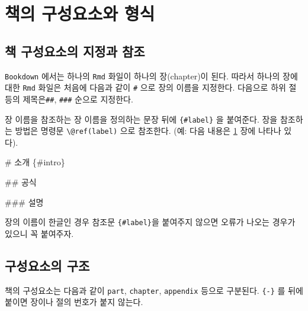 \documentclass[
]{book}
\makeatletter
\newenvironment{Shaded}{\begin{snugshade}}{\end{snugshade}}
\newcommand{\FunctionTok}[1]{\textcolor[rgb]{0.00,0.00,0.00}{#1}}
\newenvironment{kframe}{%
\medskip{}
\setlength{\fboxsep}{.8em}
 \def\at@end@of@kframe{}%
 \ifinner\ifhmode%
  \def\at@end@of@kframe{\end{minipage}}%
  \begin{minipage}{\columnwidth}%
 \fi\fi%
 \def\FrameCommand##1{\hskip\@totalleftmargin \hskip-\fboxsep
 \colorbox{shadecolor}{##1}\hskip-\fboxsep
     \hskip-\linewidth \hskip-\@totalleftmargin \hskip\columnwidth}%
 \MakeFramed {\advance\hsize-\width
   \@totalleftmargin\z@ \linewidth\hsize
   \@setminipage}}%
 {\par\unskip\endMakeFramed%
 \at@end@of@kframe}
\newenvironment{rmdblock}[1]
  {
  \begin{itemize}
  \renewcommand{\labelitemi}{
    \raisebox{-.7\height}[0pt][0pt]{
      {\setkeys{Gin}{width=3em,keepaspectratio}\texttt{[image: images/\#1]}}
    }
  }
  \setlength{\fboxsep}{1em}
  \begin{kframe}
  \item
  }
  {
  \end{kframe}
  \end{itemize}
  }
\newenvironment{rmdcaution}
  {\begin{rmdblock}{caution}}
  {\end{rmdblock}}
\theoremstyle{definition}
\theoremstyle{definition}
\theoremstyle{definition}
\theoremstyle{definition}
\theoremstyle{remark}
\makeatother
\begin{document}
\mainmatter

\hypertarget{intro}{%
\chapter{책의 구성요소와 형식}\label{intro}}

\hypertarget{uxcc45-uxad6cuxc131uxc694uxc18cuxc758-uxc9c0uxc815uxacfc-uxcc38uxc870}{%
\section{책 구성요소의 지정과 참조}\label{uxcc45-uxad6cuxc131uxc694uxc18cuxc758-uxc9c0uxc815uxacfc-uxcc38uxc870}}

\texttt{Bookdown} 에서는 하나의 \texttt{Rmd} 화일이 하나의 장(chapter)이 된다. 따라서 하나의 장에 대한 \texttt{Rmd} 화일은 처음에 다음과 같이 \texttt{\#} 으로 장의 이름을 지정한다. 다음으로 하위 절 등의 제목은\texttt{\#\#}, \texttt{\#\#\#} 순으로 지정한다.

장 이름을 참조하는 장 이름을 정의하는 문장 뒤에 \texttt{\{\#label\}} 을 붙여준다. 장을 참조하는 방법은 명령문 \texttt{\textbackslash{}@ref(label)} 으로 참조한다. (예: 다음 내용은 \ref{intro} 장에 나타나 있다).

\begin{Shaded}
\begin{Highlighting}[]
\FunctionTok{\# 소개 \{\#intro\}}

\FunctionTok{\#\#  공식}

\FunctionTok{\#\#\# 설명}
\end{Highlighting}
\end{Shaded}

\begin{rmdcaution}
장의 이름이 한글인 경우 참조문 \texttt{\{\#label\}}을 붙여주지 않으면 오류가 나오는 경우가 있으니 꼭 붙여주자.
\end{rmdcaution}

\hypertarget{uxad6cuxc131uxc694uxc18cuxc758-uxad6cuxc870}{%
\section{구성요소의 구조}\label{uxad6cuxc131uxc694uxc18cuxc758-uxad6cuxc870}}

책의 구성요소는 다음과 같이 \texttt{part}, \texttt{chapter}, \texttt{appendix} 등으로 구분된다. \texttt{\{-\}} 를 뒤에 붙이면 장이나 절의 번호가 붙지 않는다.
\end{document}
